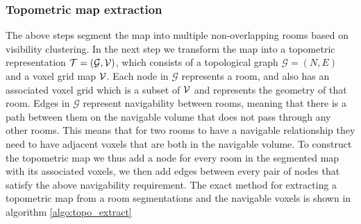 \subsubsection{Topometric map extraction}
The above steps segment the map into multiple non-overlapping rooms based on visibility clustering. In the next step we transform the map into a topometric representation \(\mathcal{T} = (\mathcal{G}, \mathcal{V})\), which consists of a topological graph \(\mathcal{G}=(N,E)\) and a voxel grid map \(\mathcal{V}\). Each node in \(\mathcal{G}\) represents a room, and also has an associated voxel grid which is a subset of \(\mathcal{V}\) and represents the geometry of that room. Edges in \(\mathcal{G}\) represent navigability between rooms, meaning that there is a path between them on the navigable volume that does not pass through any other rooms. This means that for two rooms to have a navigable relationship they need to have adjacent voxels that are both in the navigable volume. To construct the topometric map we thus add a node for every room in the segmented map with its associated voxels, we then add edges between every pair of nodes that satisfy the above navigability requirement. The exact method for extracting a topometric map from a room segmentations and the navigable voxels is shown in algorithm \ref{algo:topo_extract}


